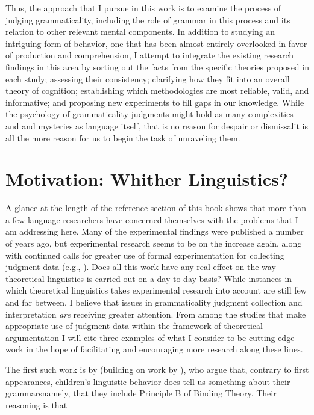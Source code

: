 Thus, the approach that I pursue in this work is to examine the process of judging grammaticality, including the role of grammar in this process and its relation to other relevant mental components. In addition to studying an intriguing form of behavior, one that has been almost entirely overlooked in favor of production and comprehension, I attempt to integrate the existing research findings in this area by sorting out the facts from the specific theories proposed in each study; assessing their consistency; clarifying how they fit into an overall theory of cognition; establishing which methodologies are most reliable, valid, and informative; and proposing new experiments to fill gaps in our knowledge. While the psychology of grammaticality judgments might hold as many complexities and and mysteries as language itself, that is no reason for despair or dismissal\schdash{}it is all the more reason for us to begin the task of unraveling them.

\section{Motivation: Whither Linguistics?}\label{sec:1.3} 

A glance at the length of the reference section of this book shows that more than a few language researchers have concerned themselves with the problems that I am addressing here. Many of the experimental findings were published a number of years ago, but experimental research seems to be on the increase again, along with continued calls for greater use of formal experimentation for collecting judgment data (e.g., \citet[100\textendash{}101]{Hirst1981}). Does all this work have any real effect on the way theoretical linguistics is carried out on a day-to-day basis? While instances in which theoretical linguistics takes experimental research into account are still few and far between, I believe that issues in grammaticality judgment collection and interpretation \textit{are} receiving greater attention. From among the studies that make appropriate use of judgment data within the framework of theoretical argumentation I will cite three examples of what I consider to be cutting-edge work in the hope of facilitating and encouraging more research along these lines.

The first such work is by \citet{GrimshawEtAl1990} (building on work by \citet{ChienEtAl1990}), who argue that, contrary to first appearances, children's linguistic behavior does tell us something about their grammars\schdash{}namely, that they include Principle B of Binding Theory. 
Their reasoning is that

